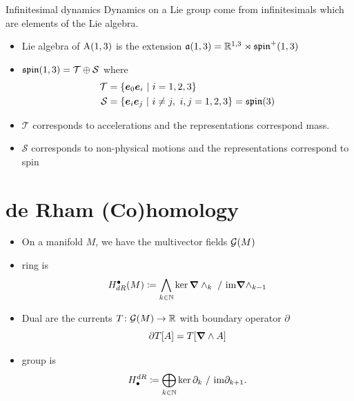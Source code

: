 \documentclass[aspectratio=169]{beamer}
\begin{document}
\begin{frame}{Infinitesimal dynamics}
\vfill
Dynamics on a Lie group come from infinitesimals which are elements of the Lie algebra.
\begin{itemize}
	\item Lie algebra of $\mathrm{A}(1,3)$ is the extension $\mathfrak{a}(1,3)=\mathbb{R}^{1,3} \rtimes \mathfrak{spin}^+(1,3)$
	\item $\mathfrak{spin}(1,3) = \mathcal{T} \oplus \mathcal{S}$ where
	\begin{align*}
		\mathcal{T} &= \{ \boldsymbol{e}_0 \boldsymbol{e}_i ~\vert~ i=1,2,3\}\\
		\mathcal{S} &= \{ \boldsymbol{e}_i \boldsymbol{e}_j ~\vert~ i\neq j,~ i,j=1,2,3\} = \mathfrak{spin}(3)
	\end{align*}
	\item $\mathcal{T}$ corresponds to accelerations and the representations correspond mass.
	\item $\mathcal{S}$ corresponds to non-physical motions and the representations correspond to spin 
\end{itemize}
\vfill
\end{frame}



\section{de Rham (Co)homology}


\begin{frame}{}
\vfill
\begin{itemize}
    \item On a manifold $M$, we have the multivector fields $\mathcal{G}(M)$
     \item {} ring is
        \[
            H^\bullet_{dR}(M) \coloneqq \bigwedge_{k \in \mathbb{N}} \ker \boldsymbol{\nabla} \wedge_k ~/~ \mathrm{im} \boldsymbol{\nabla} \wedge_{k-1}
        \]
    \item Dual are the currents $T\colon \mathcal{G}(M) \to \mathbb{R}$ with boundary operator $\partial$
        \[
            \partial T[A] = T[\boldsymbol{\nabla} \wedge A]
        \]
        \item {} group is
        \[
            H_\bullet^{dR}  \coloneqq \bigoplus_{k\in \mathbb{N}} \ker \partial_k ~/~ \mathrm{im} \partial_{k+1}. 
        \]
\end{itemize}
\vfill
\end{frame}
\end{document}
